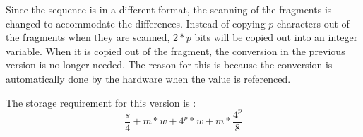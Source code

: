 Since the sequence is in a different format, the scanning of the fragments
is changed to accommodate the differences.  Instead of
copying $p$ characters out of the fragments when they are scanned, $2*p$
bits will be copied out into an integer variable.  When it is copied out of
the fragment, the conversion in the previous version is
no longer needed.  The reason for this is because the
conversion is automatically done by the hardware when the value is
referenced.

The storage requirement for this version is :
\[ \frac{s}{4} + m*w + 4^p*w + m*\frac{4^p}{8} \]
